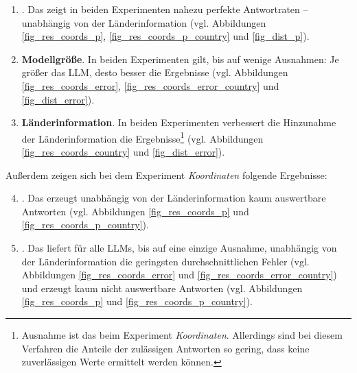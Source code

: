 \begin{enumerate}
    \item \textbf{\jsonv{}}. Das \jsonv{} zeigt in beiden Experimenten nahezu perfekte Antwortraten -- unabhängig von der Länderinformation (vgl. Abbildungen \ref{fig_res_coords_p}, \ref{fig_res_coords_p_country} und \ref{fig_dist_p}).
    \item \textbf{Modellgröße}. In beiden Experimenten gilt, bis auf wenige Ausnahmen: Je größer das LLM, desto besser die Ergebnisse (vgl. Abbildungen \ref{fig_res_coords_error}, \ref{fig_res_coords_error_country} und \ref{fig_dist_error}).
    \item \textbf{Länderinformation}. In beiden Experimenten verbessert die Hinzunahme der Länderinformation die Ergebnisse\footnote{Ausnahme ist das \regexv{} beim Experiment \textit{Koordinaten}. Allerdings sind bei diesem Verfahren die Anteile der zulässigen Antworten so gering, dass keine zuverlässigen Werte ermittelt werden können.} (vgl. Abbildungen \ref{fig_res_coords_country} und \ref{fig_dist_error}).
\end{enumerate}

Außerdem zeigen sich bei dem Experiment \textit{Koordinaten} folgende Ergebnisse:

\begin{enumerate}
    \setcounter{enumi}{3}
    \item \textbf{\regexv{}}. Das \regexv{} erzeugt unabhängig von der Länderinformation kaum auswertbare Antworten (vgl. Abbildungen \ref{fig_res_coords_p} und \ref{fig_res_coords_p_country}).
    \item \textbf{\llmv{}}. Das \llmv{} liefert für alle LLMs, bis auf eine einzige Ausnahme, unabhängig von der Länderinformation die geringsten durchschnittlichen Fehler (vgl. Abbildungen \ref{fig_res_coords_error} und \ref{fig_res_coords_error_country}) und erzeugt kaum nicht auswertbare Antworten (vgl. Abbildungen \ref{fig_res_coords_p} und \ref{fig_res_coords_p_country}).
\end{enumerate}
